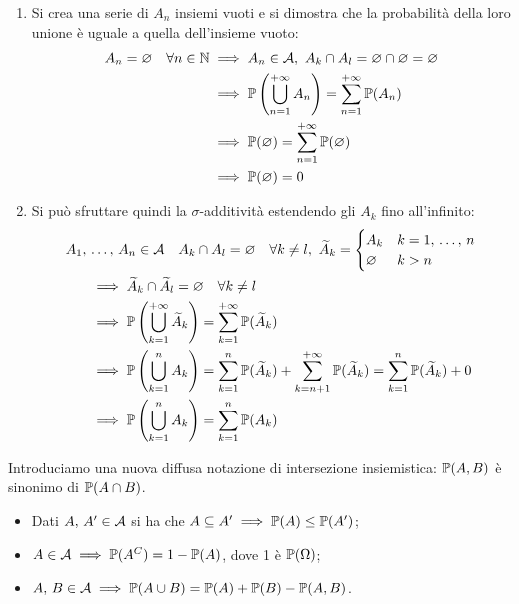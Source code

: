 \begin{dimo}\belowdisplayskip=-21pt
  \Fixvmode
  \begin{enumerate}
    \item Si crea una serie di $A_n$ insiemi vuoti e si dimostra che la probabilità della loro unione è uguale a quella dell'insieme vuoto:
    \begin{align*}
      A_n = \varnothing \quad \forall n \in \mathbb N &\implies A_n \in \mathcal A, \ A_k \cap A_l = \varnothing \cap \varnothing = \varnothing\\
      &\implies \mathbb P\left(\bigcup\limits_{n=1}^{+\infty} A_n\right) = \sum\limits_{n=1}^{+\infty}\mathbb P(A_n)\\
      &\implies \mathbb P(\varnothing) = \sum\limits_{n=1}^{+\infty}\mathbb P(\varnothing)\\
      &\implies \mathbb P(\varnothing) = 0
    \end{align*}
    \item Si può sfruttare quindi la $\sigma$-additività estendendo gli $A_k$ fino all'infinito:
    \begin{align*}
      A_1, \, & \dots, \, A_n \in \mathcal A \quad A_k \cap A_l = \varnothing \quad \forall k \neq l,\  \widetilde A_k =  \begin{cases} A_k & k = 1, \, \dots, \, n \\ \varnothing & k > n \end{cases}\\
      &\implies \widetilde A_k \cap \widetilde A_l = \varnothing \quad \forall k \neq l\\*
      &\implies \mathbb P \left(\bigcup\limits_{k=1}^{+\infty} \widetilde A_k \right) = \sum\limits_{k=1}^{+\infty} \mathbb P(\widetilde A_k)\\*
      &\implies \mathbb P \left(\bigcup\limits_{k=1}^{n} A_k \right)
      = \sum\limits_{k=1}^{n} \mathbb P(\widetilde{A}_k) + \sum\limits_{k=n+1}^{+\infty} \mathbb P(\widetilde{A}_k)= \sum\limits_{k=1}^{n} \mathbb P(\widetilde{A}_k) + 0 \\*
      &\implies \mathbb P \left(\bigcup\limits_{k=1}^{n} A_k \right) = \sum\limits_{k=1}^{n} \mathbb P(A_k)
    \end{align*}\qedhere
  \end{enumerate}
\end{dimo}
\bigskip
Introduciamo una nuova diffusa notazione di intersezione insiemistica: $\mathbb P(A,B)$ è sinonimo di $\mathbb P(A \cap B)$.
\medskip
\begin{coro}\label{coro-definizione-prob}
  \Fixvmode
  \begin{itemize}
    \item Dati $A, \, A' \in \mathcal A$ si ha che $A \subseteq A' \implies \mathbb P(A) \leq \mathbb P(A')$;
    \item $A \in \mathcal A \implies \mathbb P(A^C) = 1-\mathbb P(A)$, dove 1 è $\mathbb P(\Omega)$;
    \item $A,\, B \in \mathcal A \implies \mathbb P(A \cup B) = \mathbb P(A) + \mathbb P(B) - \mathbb P(A,B)$.
  \end{itemize}
\end{coro}

